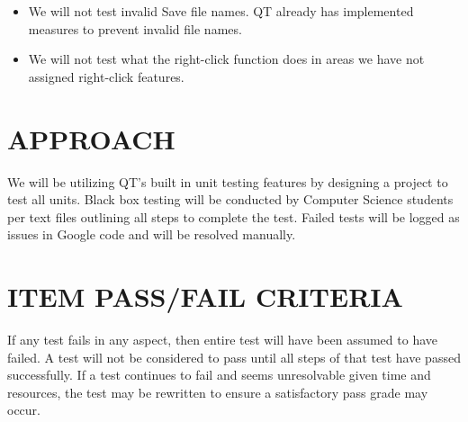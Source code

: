 \documentclass[twoside,letterpaper]{article}
\begin{document}
\begin{itemize}
\item We will not test invalid Save file names. QT already has implemented measures to prevent invalid file names.
\item We will not test what the right-click function does in areas we have not assigned right-click features.
\end{itemize}



\section[APPROACH]{\bfseries APPROACH}

We will be utilizing QT's built in unit testing features by designing a project to test all units. 
Black box testing will be conducted by Computer Science students per text files outlining all steps to complete the test. Failed tests will be logged as issues in Google code and will be resolved manually.


\section[ITEM PASS/FAIL CRITERIA]
{\bfseries ITEM PASS/FAIL CRITERIA}

If any test fails in any aspect, then entire test will have been assumed to have failed. A test will not be considered to pass until all steps of that test have passed successfully. If a test continues to fail and seems unresolvable given time and resources, the test may be rewritten to ensure a satisfactory pass grade may occur.
\end{document}

